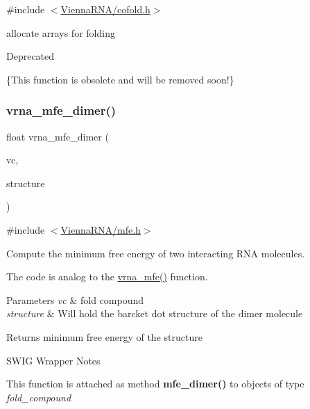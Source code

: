 {\ttfamily \#include $<$\hyperlink{cofold_8h}{Vienna\+R\+N\+A/cofold.\+h}$>$}

allocate arrays for folding \begin{DoxyRefDesc}{Deprecated}
\item[\hyperlink{deprecated__deprecated000038}{Deprecated}]\{This function is obsolete and will be removed soon!\} \end{DoxyRefDesc}
\mbox{\label{group__mfe__cofold_gaab22d10c1190f205f16a77cab9d5d3ee}} 
\subsubsection{\texorpdfstring{vrna\+\_\+mfe\+\_\+dimer()}{vrna\_mfe\_dimer()}}
{\footnotesize\ttfamily float vrna\+\_\+mfe\+\_\+dimer (\begin{DoxyParamCaption}\item[{\hyperlink{group__fold__compound_ga1b0cef17fd40466cef5968eaeeff6166}{vrna\+\_\+fold\+\_\+compound\+\_\+t} $\ast$}]{vc,  }\item[{char $\ast$}]{structure }\end{DoxyParamCaption})}



{\ttfamily \#include $<$\hyperlink{mfe_8h}{Vienna\+R\+N\+A/mfe.\+h}$>$}



Compute the minimum free energy of two interacting R\+NA molecules. 

The code is analog to the \hyperlink{group__mfe__fold_gabd3b147371ccf25c577f88bbbaf159fd}{vrna\+\_\+mfe()} function.


\begin{DoxyParams}{Parameters}
{\em vc} & fold compound \\
\hline
{\em structure} & Will hold the barcket dot structure of the dimer molecule \\
\hline
\end{DoxyParams}
\begin{DoxyReturn}{Returns}
minimum free energy of the structure
\end{DoxyReturn}
\begin{DoxyRefDesc}{S\+W\+I\+G Wrapper Notes}
\item[\hyperlink{wrappers__wrappers000047}{S\+W\+I\+G Wrapper Notes}]This function is attached as method {\bfseries mfe\+\_\+dimer()} to objects of type {\itshape fold\+\_\+compound} \end{DoxyRefDesc}

